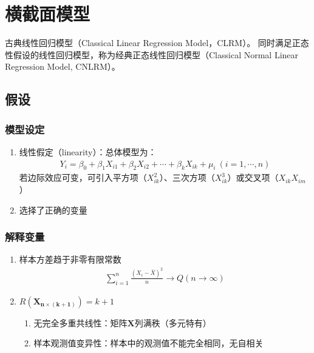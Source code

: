 \documentclass[12pt]{book}
\begin{document}
\section{横截面模型}







古典线性回归模型（Classical Linear Regression Model，CLRM）。 同时满足正态性假设的线性回归模型，称为经典正态线性回归模型（Classical Normal Linear Regression Model, CNLRM）。

\subsection{假设}

\subsubsection{模型设定}


\begin{enumerate}[1.]
    \item 线性假定（linearity）：总体模型为：
          \begin{gather*}
              Y_i=\beta_0+\beta_1X_{i1}+\beta_2X_{i2}+\cdots+\beta_kX_{ik}+\mu_i\ \left(i=1,\cdots,n\right)
          \end{gather*}
          若边际效应可变，可引入平方项（$X_{ik}^2$）、三次方项（$X_{ik}^3$）或交叉项（$X_{ik}X_{im}$）
    \item 选择了正确的变量
\end{enumerate}




\subsubsection{解释变量}


\begin{enumerate}[1.]
    \item 样本方差趋于非零有限常数
    \begin{gather*}
        \sum_{i=1}^{n}\frac{\left(X_i-\bar{X}\right)^2}{n}\rightarrow Q (n\rightarrow \infty )
    \end{gather*}
    \item $R\left(\bm{X}_{\bm{n}\times\left(\bm{k}+\bm{1}\right)}\right)=k+1$
    \begin{enumerate}[(1)]
        \item 无完全多重共线性：矩阵$\bm{X}$列满秩（多元特有）
        \item 样本观测值变异性：样本中的观测值不能完全相同，无自相关
    \end{enumerate}
\end{enumerate}
\end{document}
